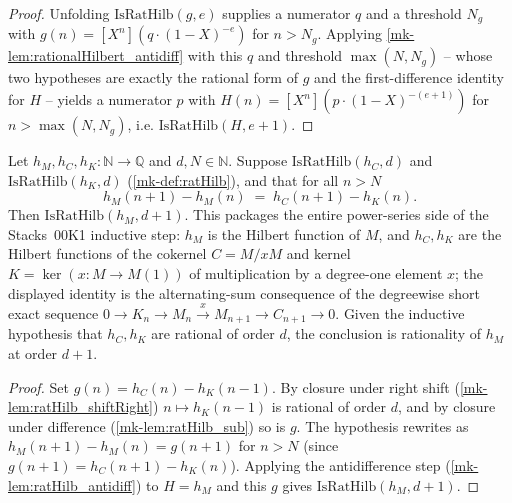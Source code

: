 \begin{proof}
  \leanok
  Unfolding \(\mathrm{IsRatHilb}(g, e)\) supplies a numerator \(q\) and a
  threshold \(N_g\) with \(g(n) = [X^n](q\cdot(1-X)^{-e})\) for \(n > N_g\).
  Applying \ref{mk-lem:rationalHilbert_antidiff} with this \(q\) and threshold
  \(\max(N, N_g)\) -- whose two hypotheses are exactly the rational form of \(g\)
  and the first-difference identity for \(H\) -- yields a numerator \(p\) with
  \(H(n) = [X^n](p\cdot(1-X)^{-(e+1)})\) for \(n > \max(N, N_g)\), i.e.
  \(\mathrm{IsRatHilb}(H, e+1)\).
\end{proof}

\begin{lemma}\label{mk-lem:ratHilb_ofDiffEq}
  \leanok

  Let \(h_M, h_C, h_K : \mathbb{N} \to \mathbb{Q}\) and \(d, N \in \mathbb{N}\).
  Suppose \(\mathrm{IsRatHilb}(h_C, d)\) and \(\mathrm{IsRatHilb}(h_K, d)\)
  (\ref{mk-def:ratHilb}), and that for all \(n > N\)
  \[
    h_M(n+1) - h_M(n) \;=\; h_C(n+1) - h_K(n).
  \]
  Then \(\mathrm{IsRatHilb}(h_M, d+1)\). This packages the entire power-series
  side of the Stacks~00K1 inductive step: \(h_M\) is the Hilbert function of
  \(M\), and \(h_C, h_K\) are the Hilbert functions of the cokernel
  \(C = M/xM\) and kernel \(K = \ker(x : M \to M(1))\) of multiplication by a
  degree-one element \(x\); the displayed identity is the alternating-sum
  consequence of the degreewise short exact sequence
  \(0 \to K_n \to M_n \xrightarrow{x} M_{n+1} \to C_{n+1} \to 0\). Given the
  inductive hypothesis that \(h_C, h_K\) are rational of order \(d\), the
  conclusion is rationality of \(h_M\) at order \(d+1\).
\end{lemma}

\begin{proof}
  \leanok
  Set \(g(n) = h_C(n) - h_K(n-1)\). By closure under right shift
  (\ref{mk-lem:ratHilb_shiftRight}) \(n \mapsto h_K(n-1)\) is rational of order
  \(d\), and by closure under difference (\ref{mk-lem:ratHilb_sub}) so is \(g\). The
  hypothesis rewrites as \(h_M(n+1) - h_M(n) = g(n+1)\) for \(n > N\) (since
  \(g(n+1) = h_C(n+1) - h_K(n)\)). Applying the antidifference step
  (\ref{mk-lem:ratHilb_antidiff}) to \(H = h_M\) and this \(g\) gives
  \(\mathrm{IsRatHilb}(h_M, d+1)\).
\end{proof}

